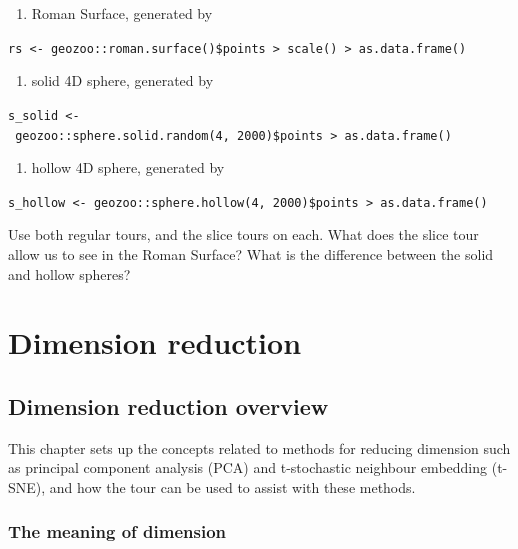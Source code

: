 \documentclass[
  letterpaper,
]{krantz}
\providecommand{\tightlist}{%
  \setlength{\itemsep}{0pt}\setlength{\parskip}{0pt}}\usepackage{longtable,booktabs,array}
\begin{document}
\begin{enumerate}
\def\labelenumi{\alph{enumi}.}
\tightlist
\item
  Roman Surface, generated by
\end{enumerate}

\texttt{rs\ \textless{}-\ geozoo::roman.surface()\$points\ \textbar{}\textgreater{}\ scale()\ \textbar{}\textgreater{}\ as.data.frame()}

\begin{enumerate}
\def\labelenumi{\alph{enumi}.}
\setcounter{enumi}{1}
\tightlist
\item
  solid 4D sphere, generated by
\end{enumerate}

\texttt{s\_solid\ \textless{}-\ geozoo::sphere.solid.random(4,\ 2000)\$points\ \textbar{}\textgreater{}\ as.data.frame()}

\begin{enumerate}
\def\labelenumi{\alph{enumi}.}
\setcounter{enumi}{2}
\tightlist
\item
  hollow 4D sphere, generated by
\end{enumerate}

\texttt{s\_hollow\ \textless{}-\ geozoo::sphere.hollow(4,\ 2000)\$points\ \textbar{}\textgreater{}\ as.data.frame()}

Use both regular tours, and the slice tours on each. What does the slice
tour allow us to see in the Roman Surface? What is the difference
between the solid and hollow spheres?

\part{Dimension reduction}

\chapter{Dimension reduction overview}\label{sec-dimension-overview}

This chapter sets up the concepts related to methods for reducing
dimension such as principal component analysis (PCA) and t-stochastic
neighbour embedding (t-SNE), and how the tour can be used to assist with
these methods.

\section{The meaning of dimension}\label{the-meaning-of-dimension}
\end{document}
